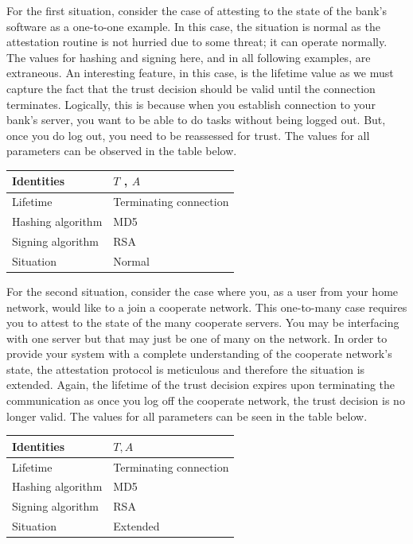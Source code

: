 \documentclass[12pt, letterpaper, twoside]{article}
\begin{document}
For the first situation, consider the case of attesting to the state of the bank's software as a one-to-one example. In this case, the situation is normal as the attestation routine is not hurried due to some threat; it can operate normally. The values for hashing and signing here, and in all following examples, are extraneous. An interesting feature, in this case, is the lifetime value as we must capture the fact that the trust decision should be valid until the connection terminates. Logically, this is because when you establish connection to your bank's server, you want to be able to do tasks without being logged out. But, once you do log out, you need to be reassessed for trust. The values for all parameters can be observed in the table below. 

\begin{center}
    \begin{tabular}{ | m{15em} | m{15em}| } 
      \hline
      Identities & $T$ , $A$ \\ 
      \hline
      Lifetime & Terminating connection \\ 
      \hline
      Hashing algorithm & MD5 \\
      \hline
      Signing algorithm & RSA \\
      \hline
      Situation & Normal \\
      \hline
    \end{tabular}
\end{center}

For the second situation, consider the case where you, as a user from your home network, would like to a join a cooperate network. This one-to-many case requires you to attest to the state of the many cooperate servers. You may be interfacing with one server but that may just be one of many on the network. In order to provide your system with a complete understanding of the cooperate network's state, the attestation protocol is meticulous and therefore the situation is extended. Again, the lifetime of the trust decision expires upon terminating the communication as once you log off the cooperate network, the trust decision is no longer valid. The values for all parameters can be seen in the table below. 

\begin{center}
    \begin{tabular}{ | m{15em} | m{15em}| } 
      \hline
      Identities & $T , A$ \\ 
      \hline
      Lifetime & Terminating connection \\ 
      \hline
      Hashing algorithm & MD5 \\
      \hline
      Signing algorithm & RSA \\
      \hline
      Situation & Extended \\
      \hline
    \end{tabular}
\end{center}
\end{document}
